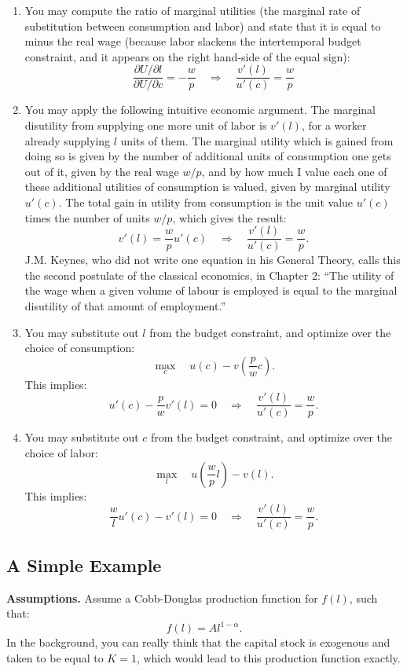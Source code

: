 \documentclass[]{book}
\begin{document}
\begin{enumerate}
\def\labelenumi{\arabic{enumi}.}
\item
  You may compute the ratio of marginal utilities (the marginal rate of
  substitution between consumption and labor) and state that it is equal
  to minus the real wage (because labor slackens the intertemporal
  budget constraint, and it appears on the right hand-side of the equal
  sign):
  \[\frac{\partial U / \partial l}{\partial U / \partial c} = -\frac{w}{p} \quad\Rightarrow\quad \boxed{\frac{v'(l)}{u'(c)}=\frac{w}{p}}\]
\item
  You may apply the following intuitive economic argument. The marginal
  disutility from supplying one more unit of labor is \(v'(l)\), for a
  worker already supplying \(l\) units of them. The marginal utility
  which is gained from doing so is given by the number of additional
  units of consumption one gets out of it, given by the real wage
  \(w/p\), and by how much I value each one of these additional
  utilities of consumption is valued, given by marginal utility
  \(u'(c)\). The total gain in utility from consumption is the unit
  value \(u'(c)\) times the number of units \(w/p\), which gives the
  result:
  \[v'(l)=\frac{w}{p}u'(c)\quad \Rightarrow \quad \boxed{\frac{v'(l)}{u'(c)}=\frac{w}{p}.}\]
  J.M. Keynes, who did not write one equation in his General Theory,
  calls this the second postulate of the classical economics, in Chapter
  2: ``The utility of the wage when a given volume of labour is employed
  is equal to the marginal disutility of that amount of employment.''
\item
  You may substitute out \(l\) from the budget constraint, and optimize
  over the choice of consumption:
  \[\max_c \quad u(c)-v\left(\frac{p}{w} c\right).\] This implies:
  \[u'(c)-\frac{p}{w}v'(l)=0 \quad \Rightarrow \quad \frac{v'(l)}{u'(c)}=\frac{w}{p}.\]
\item
  You may substitute out \(c\) from the budget constraint, and optimize
  over the choice of labor:
  \[\max_l \quad u\left(\frac{w}{p}l\right)-v(l).\] This implies:
  \[\frac{w}{l}u'(c)-v'(l)=0 \quad \Rightarrow \quad \boxed{\frac{v'(l)}{u'(c)}=\frac{w}{p}}.\]
\end{enumerate}

\subsection{A Simple Example}\label{a-simple-example}

\textbf{Assumptions.} Assume a Cobb-Douglas production function for
\(f(l)\), such that: \[f(l)=A l^{1-\alpha}.\] In the background, you can
really think that the capital stock is exogenous and taken to be equal
to \(K=1\), which would lead to this production function exactly.
\end{document}
